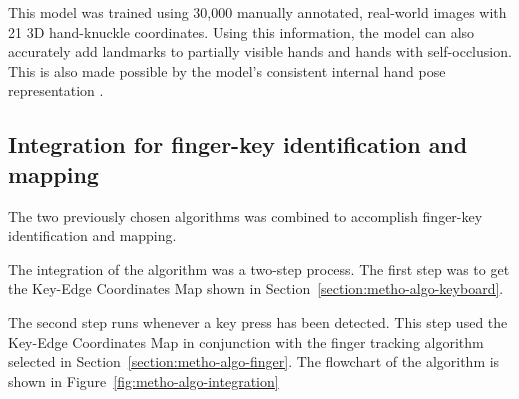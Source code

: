 \documentclass{report}
\begin{document}
This model was trained using 30,000 manually annotated, real-world images with
21 3D hand-knuckle coordinates. Using this information, the model can also
accurately add landmarks to partially visible hands and hands with
self-occlusion. This is also made possible by the model's consistent internal
hand pose representation \parencite{mediapipe-hands}.

\subsection{Integration for finger-key identification and mapping}

The two previously chosen algorithms was combined to accomplish finger-key
identification and mapping.

The integration of the algorithm was a two-step process. The first step was to
get the Key-Edge Coordinates Map shown in
Section~\ref{section:metho-algo-keyboard}.

The second step runs whenever a key press has been detected. This step used the
Key-Edge Coordinates Map in conjunction with the finger tracking algorithm selected
in Section~\ref{section:metho-algo-finger}. The flowchart of the algorithm is
shown in Figure~\ref{fig:metho-algo-integration}
\end{document}
